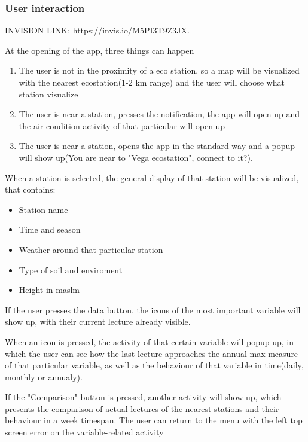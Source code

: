 \documentclass[12pt]{article} %
\begin{document}
\subsubsection{User interaction}
INVISION LINK: https://invis.io/M5PI3T9Z3JX.

At the opening of the app, three things can happen
\begin{enumerate}
    \item The user is not in the proximity of a eco station, so a map will be visualized with the nearest ecostation(1-2 km range) and the user will choose what station visualize
    \item The user is near a station, presses the notification, the app will open up and the air condition activity of that particular  will open up
    \item The user is near a station, opens the app in the standard way and a popup will show up(You are near to "Vega ecostation", connect to it?).
\end{enumerate}


When a station is selected, the general display of that station will be visualized, that contains:
\begin{itemize}
\item Station name
\item Time and season
\item Weather around that particular station
\item Type of soil and enviroment
\item Height in maslm
\end{itemize}

If the user presses the data button, the icons of the most important variable will show up, with their current lecture already visible.

When an icon is pressed, the activity of that certain variable will popup up, in which the user can see how the last lecture approaches the annual max measure of that particular variable, as well as the behaviour of that variable in time(daily, monthly or annualy).

If the "Comparison" button is pressed, another activity will show up, which presents the comparison of actual lectures of the nearest stations and their behaviour in a week timespan.
The user can return to the menu with the left top screen error on the variable-related activity
\end{document}
